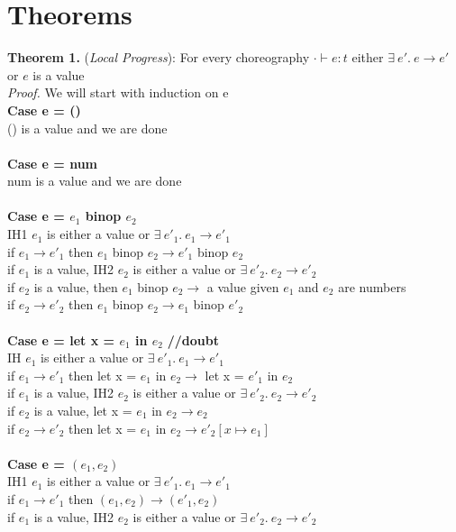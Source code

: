 \documentclass{article}
\begin{document}
\section{Theorems}
\textbf{Theorem 1.} (\textit{Local Progress}): For every choreography $\cdot \vdash e : t$ either $  \exists \ e'.\ e \to e'$  or $e$ is a value
  \\
\textit{Proof.} We will start with induction on e \\
\textbf{Case e = ()} \\
() is a value and we are done \\ \\
\textbf{Case e = num} \\
num is a value and we are done \\ \\
\textbf{Case e = $e_1$ binop $e_2$} \\
IH1 $e_1$ is either a value or $  \exists \ e'_1.\ e_1 \to e'_1 $ \\
if $e_1 \to e'_1$ then $e_1$ binop $e_2 \to e'_1$ binop $e_2$ \\
if $e_1$ is a value, IH2 $e_2$ is either a value or $  \exists \ e'_2.\ e_2 \to e'_2 $ \\
if $e_2$ is a value, then $e_1$ binop $e_2 \to$ a value given $e_1$ and $e_2$ are numbers \\
if $e_2 \to e'_2$ then $e_1$ binop $e_2 \to e_1$ binop $e'_2$ \\ \\
\textbf{Case e = let x = $e_1$ in $ e_2$}   \textbf{//doubt}\\
IH $e_1$ is either a value or $  \exists \ e'_1.\ e_1 \to e'_1 $ \\
if $e_1 \to e'_1$ then let x = $e_1$ in $ e_2 \to $ let x = $e'_1$ in $ e_2$\\
if $e_1$ is a value, IH2 $e_2$ is either a value or $  \exists \ e'_2.\ e_2 \to e'_2 $ \\
if $e_2$ is a value, let x = $e_1$ in $ e_2 \to e_2$ \\
if $e_2 \to e'_2$ then let x = $e_1$ in $ e_2 \to e'_2[x \mapsto e_1]$ \\ \\
\textbf{Case e = $(e_1,e_2)$} \\
IH1 $e_1$ is either a value or $  \exists \ e'_1.\ e_1 \to e'_1 $ \\
if $e_1 \to e'_1$ then $(e_1,e_2) \to (e'_1, e_2)$\\
if $e_1$ is a value, IH2 $e_2$ is either a value or $  \exists \ e'_2.\ e_2 \to e'_2 $ \\
\end{document}
